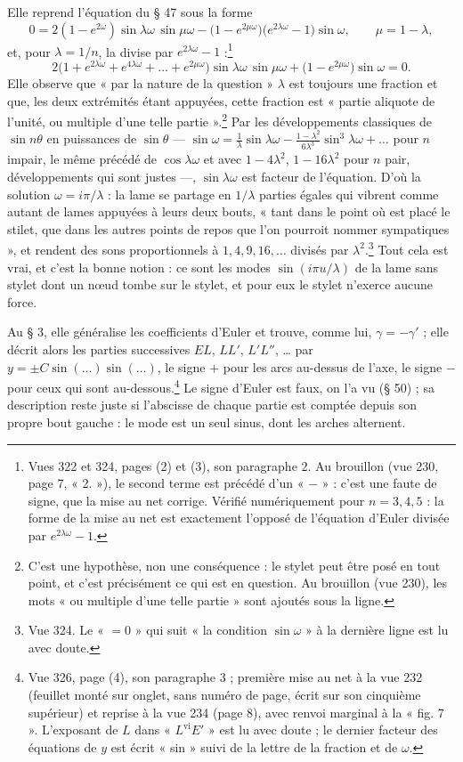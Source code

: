 \documentclass[11pt,a4paper]{article}
\begin{document}
Elle reprend l'équation du § 47 sous la forme
\[
0=2(1-e^{2\omega})\sin\lambda\omega\,\sin\mu\omega-\bigl(1-e^{2\mu\omega}\bigr)\bigl(e^{2\lambda\omega}-1\bigr)\sin\omega,\qquad \mu=1-\lambda,
\]
et, pour $\lambda=1/n$, la divise par $e^{2\lambda\omega}-1$ :\footnote{Vues 322 et 324, pages (2) et (3), son paragraphe 2. Au brouillon (vue 230, page 7, « 2. »), le second terme est précédé d'un « $-$ » : c'est une faute de signe, que la mise au net corrige. Vérifié numériquement pour $n=3,4,5$ : la forme de la mise au net est exactement l'opposé de l'équation d'Euler divisée par $e^{2\lambda\omega}-1$.}
\[
2\bigl(1+e^{2\lambda\omega}+e^{4\lambda\omega}+\dots+e^{2\mu\omega}\bigr)\sin\lambda\omega\,\sin\mu\omega+\bigl(1-e^{2\mu\omega}\bigr)\sin\omega=0 .
\]
Elle observe que « par la nature de la question » $\lambda$ est toujours une fraction et que, les deux extrémités étant appuyées, cette fraction est « partie aliquote de l'unité, ou multiple d'une telle partie ».\footnote{C'est une hypothèse, non une conséquence : le stylet peut être posé en tout point, et c'est précisément ce qui est en question. Au brouillon (vue 230), les mots « ou multiple d'une telle partie » sont ajoutés sous la ligne.} Par les développements classiques de $\sin n\theta$ en puissances de $\sin\theta$ — $\sin\omega=\frac1\lambda\sin\lambda\omega-\frac{1-\lambda^2}{6\lambda^3}\sin^3\lambda\omega+\dots$ pour $n$ impair, le même précédé de $\cos\lambda\omega$ et avec $1-4\lambda^2$, $1-16\lambda^2$ pour $n$ pair, développements qui sont justes —, $\sin\lambda\omega$ est facteur de l'équation. D'où la solution $\omega=i\pi/\lambda$ : la lame se partage en $1/\lambda$ parties égales qui vibrent comme autant de lames appuyées à leurs deux bouts, « tant dans le point où est placé le stilet, que dans les autres points de repos que l'on pourroit nommer sympatiques », et rendent des sons proportionnels à $1,4,9,16,\dots$ divisés par $\lambda^2$.\footnote{Vue 324. Le « $=0$ » qui suit « la condition $\sin\omega$ » à la dernière ligne est lu avec doute.} Tout cela est vrai, et c'est la bonne notion : ce sont les modes $\sin(i\pi u/\lambda)$ de la lame sans stylet dont un nœud tombe sur le stylet, et pour eux le stylet n'exerce aucune force.

Au § 3, elle généralise les coefficients d'Euler et trouve, comme lui, $\gamma=-\gamma'$ ; elle décrit alors les parties successives $EL$, $LL'$, $L'L''$, … par $y=\pm C\sin(\dots)\sin(\dots)$, le signe $+$ pour les arcs au-dessus de l'axe, le signe $-$ pour ceux qui sont au-dessous.\footnote{Vue 326, page (4), son paragraphe 3 ; première mise au net à la vue 232 (feuillet monté sur onglet, sans numéro de page, écrit sur son cinquième supérieur) et reprise à la vue 234 (page 8), avec renvoi marginal à la « fig. 7 ». L'exposant de $L$ dans « $L^{\text{vi}}E'$ » est lu avec doute ; le dernier facteur des équations de $y$ est écrit « sin » suivi de la lettre de la fraction et de $\omega$.} Le signe d'Euler est faux, on l'a vu (§ 50) ; sa description reste juste si l'abscisse de chaque partie est comptée depuis son propre bout gauche : le mode est un seul sinus, dont les arches alternent.
\end{document}
